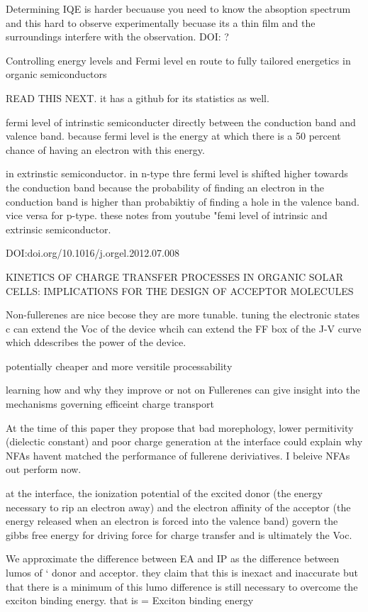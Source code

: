 	Determining IQE is harder becuause you need to know the absoption spectrum and this
		hard to observe experimentally becuase its a thin film and the surroundings 
		interfere with the observation. 
DOI: ?

	Controlling energy levels and Fermi level en route to fully tailored energetics in organic semiconductors


	READ THIS NEXT. it has a github for its statistics as well. 

   		fermi level of intrinstic semiconducter directly between the conduction band 
		and valence band. because fermi level is the energy at which there is a 50 percent chance 
		of having an electron with this energy. 

		in extrinstic semiconductor. in n-type thre fermi level is shifted higher towards the 
		conduction band because the probability of finding an electron in the conduction band 
		is higher than probabiktiy of finding a hole in the valence band. vice versa for 
		p-type. these notes from youtube "femi level of intrinsic and extrinsic semiconductor. 


DOI:doi.org/10.1016/j.orgel.2012.07.008

	KINETICS OF CHARGE TRANSFER PROCESSES IN ORGANIC SOLAR CELLS: IMPLICATIONS FOR THE
	DESIGN OF ACCEPTOR MOLECULES

		Non-fullerenes are nice becose they are more tunable. tuning the electronic states c
		can extend the Voc of the device whcih can extend the FF box of the J-V curve
		which ddescribes the power of the device. 
		
		potentially cheaper and more versitile processability

		learning how and why they improve or not on Fullerenes can give insight
		into the mechanisms governing efficeint charge transport

		At the time of this paper they propose that bad morephology, lower permitivity 
		(dielectic constant) and poor charge generation at the interface could explain
		why NFAs havent matched the performance of fullerene deriviatives. I beleive 
		NFAs out perform now. 

		at the interface, the ionization potential of the excited donor (the energy necessary
		to rip an electron away) and the electron affinity of the acceptor (the energy released
		when an electron is forced into the valence band) govern the gibbs free energy for
		driving force for charge transfer and is ultimately the Voc. 

		We approximate the difference between EA and IP as the difference between lumos of
`		donor and acceptor. they claim that this is inexact and inaccurate but that 
		there is a minimum of this lumo difference is still necessary to overcome the exciton 
		binding energy. that is \DeltaE = Exciton binding energy	

